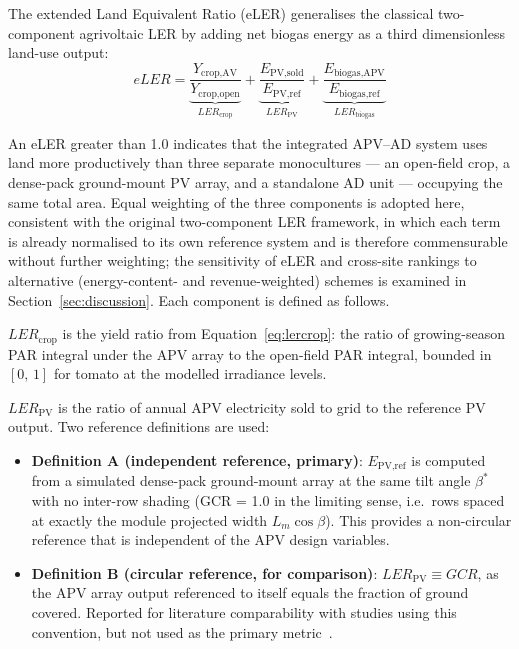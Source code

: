 \hspace{1cm}The extended Land Equivalent Ratio (eLER) generalises the
classical two-component agrivoltaic LER by adding net biogas energy as
a third dimensionless land-use output:
\begin{equation}
	eLER =
	\underbrace{\frac{Y_{\text{crop,AV}}}{Y_{\text{crop,open}}}}_{LER_{\text{crop}}}
	+
	\underbrace{\frac{E_{\text{PV,sold}}}{E_{\text{PV,ref}}}}_{LER_{\text{PV}}}
	+
	\underbrace{\frac{E_{\text{biogas,APV}}}{E_{\text{biogas,ref}}}}_{LER_{\text{biogas}}}
	\label{eq:eler}
\end{equation}

An eLER greater than 1.0 indicates that the integrated APV--AD system
uses land more productively than three separate monocultures --- an
open-field crop, a dense-pack ground-mount PV array, and a standalone
AD unit --- occupying the same total area. Equal weighting of the
three components is adopted here, consistent with the original
two-component LER framework, in which each term is already normalised
to its own reference system and is therefore commensurable without
further weighting; the sensitivity of eLER and cross-site rankings
to alternative (energy-content- and revenue-weighted) schemes is
examined in Section~\ref{sec:discussion}. Each component is defined
as follows.

\textbf{$LER_{\text{crop}}$} is the yield ratio from
Equation~\ref{eq:lercrop}: the ratio of growing-season PAR integral
under the APV array to the open-field PAR integral, bounded in
$[0,\,1]$ for tomato at the modelled irradiance levels.

\textbf{$LER_{\text{PV}}$} is the ratio of annual APV electricity
sold to grid to the reference PV output. Two reference definitions
are used:

\begin{itemize}[leftmargin=*, noitemsep]
	\item \textbf{Definition A (independent reference, primary)}: 
	$E_{\text{PV,ref}}$ is computed from a simulated dense-pack
	ground-mount array at the same tilt angle $\beta^*$ with no
	inter-row shading (GCR = 1.0 in the limiting sense, i.e.\ rows
	spaced at exactly the module projected width $L_m\cos\beta$).
	This provides a non-circular reference that is
	independent of the APV design variables.
	
	\item \textbf{Definition B (circular reference, for comparison)}:
	$LER_{\text{PV}} \equiv GCR$, as the APV array output referenced
	to itself equals the fraction of ground covered. Reported for
	literature comparability with studies using this convention, but
	not used as the primary metric~\citep{mazzeo2025}.
\end{itemize}

